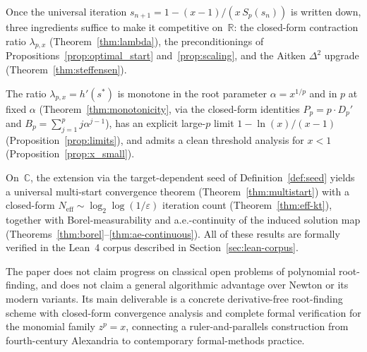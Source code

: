 \documentclass[11pt,a4paper]{article}
\theoremstyle{definition}
\begin{document}
Once the universal iteration $s_{n+1} = 1 - (x-1)/(x\,S_p(s_n))$ is written down, three ingredients suffice to make it competitive on~$\mathbb{R}$: the closed-form contraction ratio $\lambda_{p,x}$ (Theorem~\ref{thm:lambda}), the preconditionings of Propositions~\ref{prop:optimal_start} and~\ref{prop:scaling}, and the Aitken $\Delta^2$ upgrade (Theorem~\ref{thm:steffensen}).

The ratio $\lambda_{p,x} = h'(s^*)$ is monotone in the root parameter $\alpha=x^{1/p}$ and in $p$ at fixed $\alpha$ (Theorem~\ref{thm:monotonicity}, via the closed-form identities $P_p = p \cdot D_p'$ and $B_p = \sum_{j=1}^{p} j\alpha^{j-1}$), has an explicit large-$p$ limit $1 - \ln(x)/(x-1)$ (Proposition~\ref{prop:limits}), and admits a clean threshold analysis for $x < 1$ (Proposition~\ref{prop:x_small}).

On~$\mathbb{C}$, the extension via the target-dependent seed of Definition~\ref{def:seed} yields a universal multi-start convergence theorem (Theorem~\ref{thm:multistart}) with a closed-form $N_{\mathrm{eff}} \sim \log_2\log(1/\varepsilon)$ iteration count (Theorem~\ref{thm:eff-kt}), together with Borel-measurability and a.e.-continuity of the induced solution map (Theorems~\ref{thm:borel}--\ref{thm:ae-continuous}). All of these results are formally verified in the Lean~4 corpus described in Section~\ref{sec:lean-corpus}.

\medskip

The paper does not claim progress on classical open problems of polynomial root-finding, and does not claim a general algorithmic advantage over Newton or its modern variants. Its main deliverable is a concrete derivative-free root-finding scheme with closed-form convergence analysis and complete formal verification for the monomial family $z^p = x$, connecting a ruler-and-parallels construction from fourth-century Alexandria to contemporary formal-methods practice.
\end{document}
